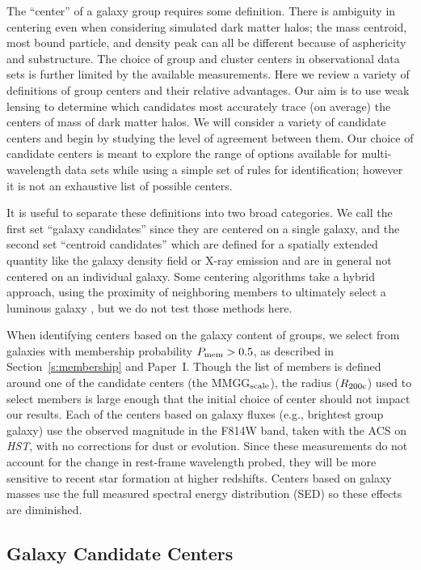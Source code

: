 \documentclass[12pt]{emulateapj}
\begin{document}
The ``center'' of a galaxy group requires some definition. There is
ambiguity in centering even when considering simulated dark matter
halos; the mass centroid, most bound particle, and density peak can
all be different because of asphericity and substructure. The
choice of group and cluster centers in observational data sets is
further limited by the available measurements. Here we review a
variety of definitions of group centers and their relative advantages.
Our aim is to use weak lensing to determine which candidates most
accurately trace (on average) the centers of mass of dark matter halos. We
will consider a variety of candidate centers and begin by studying the
level of agreement between them. Our choice of candidate centers is
meant to explore the range of options available for multi-wavelength
data sets while using a simple set of rules for identification;
however it is not an exhaustive list of possible centers.
 
It is useful to separate these definitions into two broad
categories. We call the first set ``galaxy candidates'' since they are
centered on a single galaxy, and the second set ``centroid
candidates'' which are defined for a spatially extended quantity like
the galaxy density field or X-ray emission and are in general not centered on an
individual galaxy. Some centering algorithms take a hybrid
approach, using the proximity of neighboring members to
ultimately select a luminous galaxy \citep[e.g.,][]{Robotham2011}, but we do
not test those methods here.

When identifying centers based on the galaxy content of groups, we
select from galaxies with membership probability $P_{\rm mem}>0.5$, as
described in Section~\ref{s:membership} and Paper~I. Though the list of
members is defined around one of the candidate centers (the MMGG$_{\rm
  scale}$), the radius ($R_{\rm 200c}$) used to select members is
large enough that the initial choice of center should not impact our
results. Each of the centers based on galaxy fluxes (e.g., brightest
group galaxy) use the observed magnitude in the F814W band, taken with
the ACS on \textit{HST}, with no corrections for dust or evolution. Since
these measurements do not account for the change in rest-frame
wavelength probed, they will be more sensitive to recent star
formation at higher redshifts. Centers based on galaxy masses use the
full measured spectral energy distribution (SED) so these effects are diminished.

\subsection{Galaxy Candidate Centers}
\label{s:gal_cand}
\end{document}
